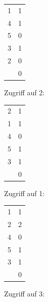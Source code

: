 \begin{enumerate}[a)]
\begin{solution}
\begin{minipage}{0.28\textwidth}
        \begin{tabular}{ | c | l}
            \cline{1-1}
            1   &   1   \\  \cline{1-1}
            4   &   1   \\  \cline{1-1}
            5   &   0   \\  \cline{1-1}
            3   &   1   \\  \cline{1-1}
            2   &   0   \\  \cline{1-1}
                &   0   \\  \cline{1-1}
        \end{tabular}
    \end{minipage}
    \begin{minipage}{0.22\textwidth}
        \center
        Zugriff auf 2:

        \begin{tabular}{ | c | l}
            \cline{1-1}
            2   &   1   \\  \cline{1-1}
            1   &   1   \\  \cline{1-1}
            4   &   0   \\  \cline{1-1}
            5   &   1   \\  \cline{1-1}
            3   &   1   \\  \cline{1-1}
                &   0   \\  \cline{1-1}
        \end{tabular}
    \end{minipage}
    \begin{minipage}{0.22\textwidth}
        \center
        Zugriff auf 1:

        \begin{tabular}{ | c | l}
            \cline{1-1}
            1   &   1   \\  \cline{1-1}
            2   &   2   \\  \cline{1-1}
            4   &   0   \\  \cline{1-1}
            5   &   1   \\  \cline{1-1}
            3   &   1   \\  \cline{1-1}
                &   0   \\  \cline{1-1}
        \end{tabular}
    \end{minipage}
    \begin{minipage}{0.22\textwidth}
        \center
        Zugriff auf 3:


\end{minipage}
\end{solution}
\end{enumerate}
